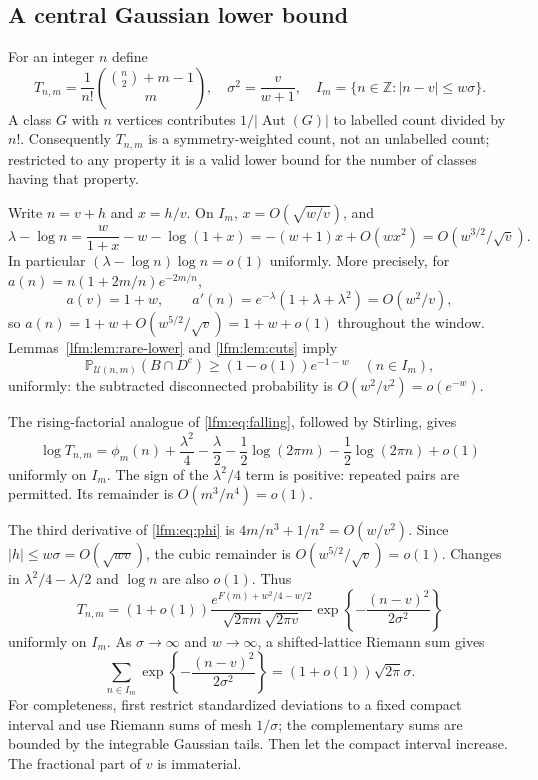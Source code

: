 \documentclass[11pt,letterpaper]{article}
\theoremstyle{remark}\newtheorem{remark}[theorem]{Remark}
\newcommand{\Prob}{\mathbb P}\newcommand{\E}{\mathbb E}
\newcommand{\U}{\mathcal U}\newcommand{\dd}{\,\mathrm d}
\DeclareMathOperator{\Aut}{Aut}
\begin{document}
\subsection{A central Gaussian lower bound}
For an integer $n$ define
\begin{equation}
 T_{n,m}=\frac1{n!}\binom{\binom n2+m-1}{m},\quad
 \sigma^2=\frac v{w+1},\quad
 I_m=\{n\in\mathbb Z:|n-v|\le w\sigma\}.\label{lfm:eq:T}
\end{equation}
A class $G$ with $n$ vertices contributes $1/|\Aut(G)|$ to labelled count divided by $n!$. Consequently $T_{n,m}$ is a symmetry-weighted count, not an unlabelled count; restricted to any property it is a valid lower bound for the number of classes having that property.

Write $n=v+h$ and $x=h/v$. On $I_m$, $x=O(\sqrt{w/v})$, and
\begin{equation}
 \lambda-\log n=\frac{w}{1+x}-w-\log(1+x)
 =-(w+1)x+O(wx^2)=O(w^{3/2}/\sqrt v).\label{lfm:eq:windowlambda}
\end{equation}
In particular $(\lambda-\log n)\log n=o(1)$ uniformly. More precisely, for $a(n)=n(1+2m/n)e^{-2m/n}$,
\[
 a(v)=1+w,\qquad
 a'(n)=e^{-\lambda}(1+\lambda+\lambda^2)=O(w^2/v),
\]
so $a(n)=1+w+O(w^{5/2}/\sqrt v)=1+w+o(1)$ throughout the window. Lemmas~\ref{lfm:lem:rare-lower} and \ref{lfm:lem:cuts} imply
\begin{equation}
 \Prob_{\U(n,m)}(B\cap D^c)
 \ge(1-o(1))e^{-1-w}\quad(n\in I_m),\label{lfm:eq:jointwindow}
\end{equation}
uniformly: the subtracted disconnected probability is $O(w^2/v^2)=o(e^{-w})$.

The rising-factorial analogue of \eqref{lfm:eq:falling}, followed by Stirling, gives
\begin{equation}
 \log T_{n,m}=\phi_m(n)+\frac{\lambda^2}{4}-\frac\lambda2
 -\frac12\log(2\pi m)-\frac12\log(2\pi n)+o(1)\label{lfm:eq:rise}
\end{equation}
uniformly on $I_m$. The sign of the $\lambda^2/4$ term is positive: repeated pairs are permitted. Its remainder is $O(m^3/n^4)=o(1)$.

The third derivative of \eqref{lfm:eq:phi} is $4m/n^3+1/n^2=O(w/v^2)$. Since $|h|\le w\sigma=O(\sqrt{wv})$, the cubic remainder is $O(w^{5/2}/\sqrt v)=o(1)$. Changes in $\lambda^2/4-\lambda/2$ and $\log n$ are also $o(1)$. Thus
\begin{equation}
 T_{n,m}=(1+o(1))
 \frac{e^{F(m)+w^2/4-w/2}}{\sqrt{2\pi m}\sqrt{2\pi v}}
 \exp\left\{-\frac{(n-v)^2}{2\sigma^2}\right\}\label{lfm:eq:gauss}
\end{equation}
uniformly on $I_m$. As $\sigma\to\infty$ and $w\to\infty$, a shifted-lattice Riemann sum gives
\[
 \sum_{n\in I_m}\exp\left\{-\frac{(n-v)^2}{2\sigma^2}\right\}
 =(1+o(1))\sqrt{2\pi}\sigma.
\]
For completeness, first restrict standardized deviations to a fixed compact interval and use Riemann sums of mesh $1/\sigma$; the complementary sums are bounded by the integrable Gaussian tails. Then let the compact interval increase. The fractional part of $v$ is immaterial.
\end{document}
